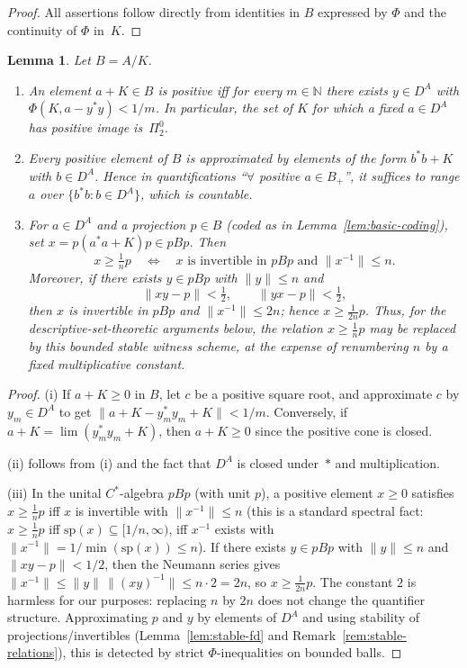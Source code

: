 \documentclass[12pt,fleqn,a4paper]{amsart}
\renewcommand{\le}{\leqslant}
\renewcommand{\ge}{\geqslant}
\numberwithin{equation}{section}
\newtheorem{lemma}[theorem]{Lemma}
\theoremstyle{definition}
\newcommand{\N}{\mathbb{N}}
\begin{document}
\begin{proof}
All assertions follow directly from identities in $B$ expressed by $\Phi$ and
the continuity of $\Phi$ in~$K$.
\end{proof}

\begin{lemma}\label{lem:positivity-coding}
Let $B=A/K$.
\begin{enumerate}
\item An element $a+K\in B$ is positive iff for every $m\in\N$ there exists
$y\in D^A$ with $\Phi(K,a-y^*y)<1/m$.  In particular, the set of $K$ for which a
fixed $a\in D^A$ has positive image is~$\Pi^0_2$.
\item Every positive element of $B$ is approximated by elements of the form $b^*b+K$
with $b\in D^A$.  Hence in quantifications
``$\forall$ positive $a\in B_+$'', it suffices to range $a$ over $\{b^*b:b\in D^A\}$,
which is countable.
\item For $a\in D^A$ and a projection $p\in B$ (coded as in
Lemma~\ref{lem:basic-coding}), set $x=p(a^*a+K)p\in pBp$.
Then
\[
x\ge \tfrac{1}{n}p
\quad\Longleftrightarrow\quad
x \text{ is invertible in }pBp \text{ and }\|x^{-1}\|\le n.
\]
Moreover, if there exists $y\in pBp$ with $\|y\|\le n$ and
\[
\|xy-p\|<\tfrac12,\qquad \|yx-p\|<\tfrac12,
\]
then $x$ is invertible in $pBp$ and $\|x^{-1}\|\le 2n$; hence
$x\ge \tfrac{1}{2n}p$.
Thus, for the descriptive-set-theoretic arguments below, the relation
$x\ge \tfrac1n p$ may be replaced by this bounded stable witness scheme,
at the expense of renumbering $n$ by a fixed multiplicative constant.
\end{enumerate}
\end{lemma}

\begin{proof}
(i) If $a+K\ge 0$ in $B$, let $c$ be a positive square root, and approximate $c$ by
$y_m\in D^A$ to get $\|a+K-y_m^*y_m+K\|<1/m$.  Conversely, if $a+K=\lim(y_m^*y_m+K)$,
then $a+K\ge 0$ since the positive cone is closed.

(ii) follows from (i) and the fact that $D^A$ is closed under~$*$ and multiplication.

(iii) In the unital $C^*$-algebra $pBp$ (with unit $p$), a positive element $x\ge 0$
satisfies $x\ge \tfrac{1}{n}p$ iff $x$ is invertible with $\|x^{-1}\|\le n$
(this is a standard spectral fact: $x\ge\tfrac{1}{n}p$ iff
$\mathrm{sp}(x)\subseteq [1/n,\infty)$, iff $x^{-1}$ exists with
$\|x^{-1}\|=1/\min(\mathrm{sp}(x))\le n$).
If there exists $y\in pBp$ with $\|y\|\le n$ and $\|xy-p\|<1/2$, then the Neumann
series gives $\|x^{-1}\|\le \|y\|\,\|(xy)^{-1}\|\le n\cdot 2=2n$, so $x\ge\frac{1}{2n}p$.
The constant $2$ is harmless for our purposes: replacing $n$ by $2n$ does not change
the quantifier structure.
Approximating $p$ and $y$ by elements of $D^A$ and using stability of
projections/invertibles (Lemma~\ref{lem:stable-fd} and
Remark~\ref{rem:stable-relations}), this is detected by strict $\Phi$-inequalities
on bounded balls.
\end{proof}
\end{document}
